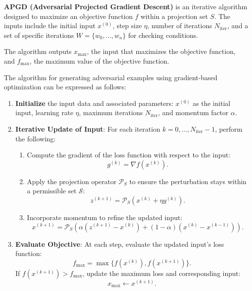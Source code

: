 
\textbf{APGD (Adversarial Projected Gradient Descent)} is an iterative algorithm designed to maximize an objective function $f$ within a projection set $S$. The inputs include the initial input $x^{(0)}$, step size $\eta$, number of iterations $N_{\text{iter}}$, and a set of specific iterations $W = \{w_0, \ldots, w_n\}$ for checking conditions.

The algorithm outputs $x_{\text{max}}$, the input that maximizes the objective function, and $f_{\text{max}}$, the maximum value of the objective function.

The algorithm for generating adversarial examples using gradient-based optimization can be expressed as follows:

\begin{enumerate}
    \item \textbf{Initialize} the input data and associated parameters:  
    $x^{(0)}$ as the initial input, learning rate $\eta$, maximum iterations $N_{\text{iter}}$, and momentum factor $\alpha$.

    \item \textbf{Iterative Update of Input}:  
    For each iteration $k = 0, \dots, N_{\text{iter}} - 1$, perform the following:  
    \begin{enumerate}
        \item Compute the gradient of the loss function with respect to the input:  
        \[
        g^{(k)} = \nabla f(x^{(k)}).
        \]
        \item Apply the projection operator $\mathcal{P}_S$ to ensure the perturbation stays within a permissible set $\mathcal{S}$:  
        \[
        z^{(k+1)} = \mathcal{P}_S \left( x^{(k)} + \eta g^{(k)} \right).
        \]
        \item Incorporate momentum to refine the updated input:  
        \[
        x^{(k+1)} = \mathcal{P}_S \left( \alpha (z^{(k+1)} - x^{(k)}) + (1 - \alpha)(x^{(k)} - x^{(k-1)}) \right).
        \]
    \end{enumerate}

    \item \textbf{Evaluate Objective}:  
    At each step, evaluate the updated input's loss function:  
    \[
    f_{\text{max}} = \max \{ f(x^{(k)}), f(x^{(k+1)}) \}.
    \]
    If $f(x^{(k+1)}) > f_{\text{max}}$, update the maximum loss and corresponding input:  
    \[
    x_{\text{max}} \gets x^{(k+1)}.
    \]


\end{enumerate}
